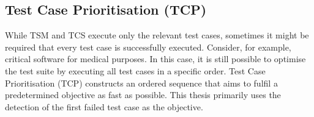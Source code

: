 \noindent{}

\subsection{Test Case Prioritisation (TCP)}
\noindent While TSM and TCS execute only the relevant test cases, sometimes it might be required that every test case is successfully executed. Consider, for example, critical software for medical purposes. In this case, it is still possible to optimise the test suite by executing all test cases in a specific order. Test Case Prioritisation (TCP) \cite{10.1002/stv.430} constructs an ordered sequence that aims to fulfil a predetermined objective as fast as possible. This thesis primarily uses the detection of the first failed test case as the objective.\\

\noindent{}
